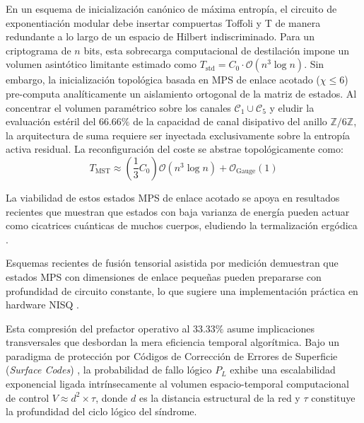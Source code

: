 \documentclass[12pt,a4paper]{article}
\theoremstyle{plain}
\theoremstyle{definition}
\theoremstyle{remark}
\begin{document}
En un esquema de inicialización canónico de máxima entropía, el circuito de exponentiación modular debe insertar compuertas Toffoli y T de manera redundante a lo largo de un espacio de Hilbert indiscriminado. Para un criptograma de $n$ bits, esta sobrecarga computacional de destilación impone un volumen asintótico limitante estimado como $T_{\text{std}} = C_0 \cdot \mathcal{O}(n^3 \log n)$. Sin embargo, la inicialización topológica basada en MPS de enlace acotado ($\chi \le 6$) pre-computa analíticamente un aislamiento ortogonal de la matriz de estados. Al concentrar el volumen paramétrico sobre los canales $\mathcal{C}_1 \cup \mathcal{C}_5$ y eludir la evaluación estéril del $66.66\%$ de la capacidad de canal disipativo del anillo $\mathbb{Z}/6\mathbb{Z}$, la arquitectura de suma requiere ser inyectada exclusivamente sobre la entropía activa residual. La reconfiguración del coste se abstrae topológicamente como:
\begin{equation}
T_{\text{MST}} \approx \left(\frac{1}{3} C_0 \right) \mathcal{O}(n^3 \log n) + \mathcal{O}_{\text{Gauge}}(1)
\label{eq:toffoli_reduction}
\end{equation}

La viabilidad de estos estados MPS de enlace acotado se apoya en resultados recientes que muestran que estados con baja varianza de energía pueden actuar como cicatrices cuánticas de muchos cuerpos, eludiendo la termalización ergódica \cite{Rai2024}.

Esquemas recientes de fusión tensorial asistida por medición demuestran que estados MPS con dimensiones de enlace pequeñas pueden prepararse con profundidad de circuito constante, lo que sugiere una implementación práctica en hardware NISQ \cite{Stephen2025}.

Esta compresión del prefactor operativo al $33.33\%$ asume implicaciones transversales que desbordan la mera eficiencia temporal algorítmica. Bajo un paradigma de protección por Códigos de Corrección de Errores de Superficie (\textit{Surface Codes}) \cite{Fowler2012}, la probabilidad de fallo lógico $P_L$ exhibe una escalabilidad exponencial ligada intrínsecamente al volumen espacio-temporal computacional de control $V \approx d^2 \times \tau$, donde $d$ es la distancia estructural de la red y $\tau$ constituye la profundidad del ciclo lógico del síndrome.
\end{document}
